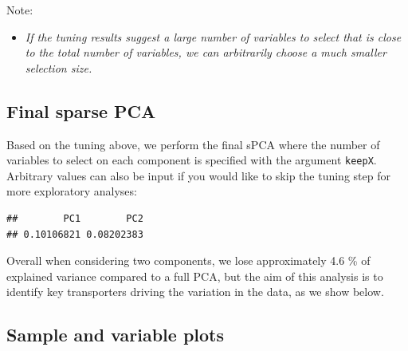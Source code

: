 \documentclass[]{book}
\newenvironment{Shaded}{\begin{snugshade}}{\end{snugshade}}
\newcommand{\KeywordTok}[1]{\textcolor[rgb]{0.13,0.29,0.53}{\textbf{#1}}}
\newcommand{\DataTypeTok}[1]{\textcolor[rgb]{0.13,0.29,0.53}{#1}}
\newcommand{\DecValTok}[1]{\textcolor[rgb]{0.00,0.00,0.81}{#1}}
\newcommand{\StringTok}[1]{\textcolor[rgb]{0.31,0.60,0.02}{#1}}
\newcommand{\CommentTok}[1]{\textcolor[rgb]{0.56,0.35,0.01}{\textit{#1}}}
\newcommand{\OperatorTok}[1]{\textcolor[rgb]{0.81,0.36,0.00}{\textbf{#1}}}
\newcommand{\NormalTok}[1]{#1}
\providecommand{\tightlist}{%
  \setlength{\itemsep}{0pt}\setlength{\parskip}{0pt}}
\begin{document}
Note:

\begin{itemize}
\tightlist
\item
  \emph{If the tuning results suggest a large number of variables to
  select that is close to the total number of variables, we can
  arbitrarily choose a much smaller selection size.}
\end{itemize}

\subsection{Final sparse PCA}\label{final-sparse-pca}

Based on the tuning above, we perform the final sPCA where the number of
variables to select on each component is specified with the argument
\texttt{keepX}. Arbitrary values can also be input if you would like to
skip the tuning step for more exploratory analyses:

\begin{Shaded}
\end{Shaded}

\begin{verbatim}
##        PC1        PC2 
## 0.10106821 0.08202383
\end{verbatim}

Overall when considering two components, we lose approximately 4.6 \% of
explained variance compared to a full PCA, but the aim of this analysis
is to identify key transporters driving the variation in the data, as we
show below.

\subsection{Sample and variable plots}\label{sample-and-variable-plots}
\end{document}
